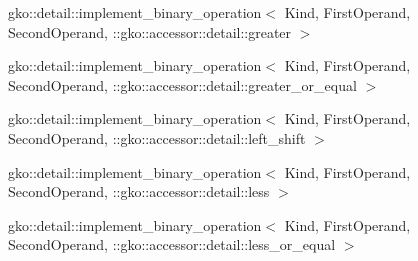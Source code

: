 \begin{DoxyCompactList}
\begin{DoxyCompactList}
\item {}
\end{DoxyCompactList}
\item gko\+:\+:detail\+:\+:implement\+\_\+binary\+\_\+operation$<$ Kind, First\+Operand, Second\+Operand, \+:\+:gko\+:\+:accessor\+:\+:detail\+:\+:greater $>$\begin{DoxyCompactList}
\item {}
\end{DoxyCompactList}
\item gko\+:\+:detail\+:\+:implement\+\_\+binary\+\_\+operation$<$ Kind, First\+Operand, Second\+Operand, \+:\+:gko\+:\+:accessor\+:\+:detail\+:\+:greater\+\_\+or\+\_\+equal $>$\begin{DoxyCompactList}
\item {}
\end{DoxyCompactList}
\item gko\+:\+:detail\+:\+:implement\+\_\+binary\+\_\+operation$<$ Kind, First\+Operand, Second\+Operand, \+:\+:gko\+:\+:accessor\+:\+:detail\+:\+:left\+\_\+shift $>$\begin{DoxyCompactList}
\item {}
\end{DoxyCompactList}
\item gko\+:\+:detail\+:\+:implement\+\_\+binary\+\_\+operation$<$ Kind, First\+Operand, Second\+Operand, \+:\+:gko\+:\+:accessor\+:\+:detail\+:\+:less $>$\begin{DoxyCompactList}
\item {}
\end{DoxyCompactList}
\item gko\+:\+:detail\+:\+:implement\+\_\+binary\+\_\+operation$<$ Kind, First\+Operand, Second\+Operand, \+:\+:gko\+:\+:accessor\+:\+:detail\+:\+:less\+\_\+or\+\_\+equal $>$\begin{DoxyCompactList}

\end{DoxyCompactList}
\end{DoxyCompactList}

